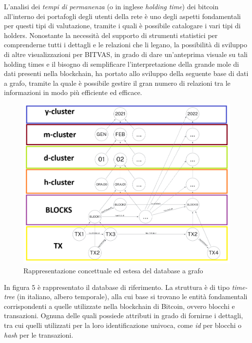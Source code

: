 L'analisi dei \emph{tempi di permanenza} (o in inglese \emph{holding time}) dei bitcoin all'interno dei portafogli degli utenti della rete \cite{holdingTimes} è uno degli aspetti fondamentali per questi tipi di valutazione, tramite i quali è possibile catalogare i vari tipi di holders.
Nonostante la necessità del supporto di strumenti statistici per comprenderne tutti i dettagli e le relazioni che li legano, la possibilità di sviluppo di altre visualizzazioni per BITVAS, in grado di dare un'anteprima visuale su tali holding times e il bisogno di semplificare l'interpretazione della grande mole di dati presenti nella blockchain, ha portato allo sviluppo della seguente base di dati a grafo, tramite la quale è possibile gestire il gran numero di relazioni tra le informazioni in modo più efficiente ed efficace.
\newpage
\thispagestyle{mystyle}
\begin{figure}[H]
    \centering \includegraphics[keepaspectratio=true,scale=0.58]{Images/ExampleDB.png}
    \caption{Rappresentazione concettuale ed estesa del database a grafo}
\end{figure}

In figura 5 è rappresentato il database di riferimento.
La struttura è di tipo \emph{time-tree} (in italiano, albero temporale), alla cui base si trovano le entità fondamentali corrispondenti a quelle utilizzate nella blockchain di Bitcoin, ovvero blocchi e transazioni.
Ognuna delle quali possiede attributi in grado di fornirne i dettagli, tra cui quelli utilizzati per la loro identificazione univoca, come \textit{id} per blocchi o \textit{hash} per le transazioni.

